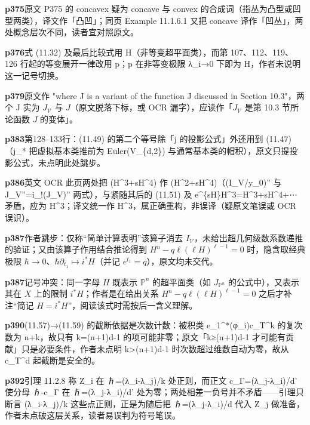 \noindent\textbf{\footnotesize p375}\quad 原文 P375 的 concavex 疑为 concave 与 convex 的合成词（指丛为凸型或凹型两类），译文作「凸凹」；同页 Example 11.1.6.1 又把 concave 译作「凹丛」，两处概念层次不同，读者宜对照原文。

\noindent\textbf{\footnotesize p376}\quad 式 (11.32) 及最后比较式用 H（非等变超平面类），而第 107、112、119、126 行起的等变展开一律改用 p；p 在非等变极限 λ\_i→0 下即为 H，作者未说明这一记号切换。

\noindent\textbf{\footnotesize p379}\quad 原文作 "where J is a variant of the function J discussed in Section 10.3"，两个 J 实为 $J_{\mathcal V}$ 与 $J$（原文脱落下标，或 OCR 漏字），应读作「$J_{\mathcal V}$ 是第 10.3 节所论函数 $J$ 的变体」。

\noindent\textbf{\footnotesize p383}\quad 第128–133行：(11.49) 的第二个等号除「j 的投影公式」外还用到 (11.47)（j\_* 把虚拟基本类推前为 Euler(V\_\{d,2\}) 与通常基本类的帽积），原文只提投影公式，未点明此处跳步。

\noindent\textbf{\footnotesize p386}\quad 英文 OCR 此页两处把 (H\^{}3+sH\^{}4) 作 (H\^{}2+sH\^{}4)（(I\_V/y\_0)'' 与 J\_V''=i\_!(J\_V)'' 两式），与紧随其后的 (11.51) 及 e\^{}\{sH\}H\^{}3=H\^{}3+sH\^{}4+⋯ 矛盾，应为 H\^{}3；译文统一作 H\^{}3，属正确重构，非误译（疑原文笔误或 OCR 误识）。

\noindent\textbf{\footnotesize p387}\quad 作者跳步：仅称“简单计算表明”该算子消去 $I_{\mathcal V}$，未给出超几何级数系数递推的验证；又由该算子作用结合推论得到 $H^n-q\ell(\ell H)^{\ell-1}=0$ 时，隐含取经典极限 $\hbar\to0$、$\hbar\partial_{t_1}\mapsto i^*H$（并记 $e^{t_1}=q$），原文均未交代。

\noindent\textbf{\footnotesize p387}\quad 记号冲突：同一字母 $H$ 既表示 $\mathbb P^n$ 的超平面类（如 $J_{\mathbb P^n}$ 的公式中），又表示其在 $X$ 上的限制 $i^*H$；作者是在给出关系 $H^n-q\ell(\ell H)^{\ell-1}=0$ 之后才补注“简记 $H=i^*H$”，阅读该式时需按后一含义理解。

\noindent\textbf{\footnotesize p390}\quad (11.57)→(11.59) 的截断依据是次数计数：被积类 e\_1\^{}*(φ\_i)c\_T\^{}k 的复次数为 n+k，故只有 k=(n+1)d-1 的项可能非零；原文「k≥(n+1)d-1 才可能有贡献」只是必要条件，作者未点明 k>(n+1)d-1 时次数超过维数自动为零，故从 c\_T\^{}d 起截断是安全的。

\noindent\textbf{\footnotesize p392}\quad 引理 11.2.8 称 Z\_i 在 ℏ=(λ\_i-λ\_j)/k 处正则，而正文 c\_Γ=(λ\_j-λ\_i)/d' 使分母 ℏ-c\_Γ 在 ℏ=(λ\_j-λ\_i)/d' 处为零；两处相差一负号并不矛盾——引理只断言 (λ\_i-λ\_j)/k 这些点正则，正是为随后把 ℏ=(λ\_j-λ\_i)/d 代入 Z\_j 做准备，作者未点破这层关系，读者易误判为符号笔误。

